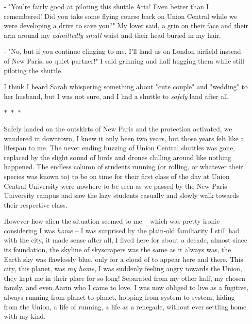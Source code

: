 \documentclass[colorlinks,12pt,a4paper]{book}
\newcommand\sep{\begin{center}
  \boldmath $\ast$~$\ast$~$\ast$
\end{center}}
\begin{document}
 - "You're fairly good at piloting this shuttle Aria! Even better than I remembered! Did you take some flying course back on Union Central 
 while we were developing a drive to save you?" My lover said, a grin on their face and their arm around my \textit{admittedly small} waist
 and their head buried in my hair.\par 
 \bigskip 
 
 - "No, but if you continue clinging to me, I'll land us on London airfield instead of New Paris, so quiet partner!" I said 
 grinning and half hugging them while still piloting the shuttle.\par 
 \bigskip
 
 I think I heard Sarah whispering something about "cute couple" and "wedding" to her husband, but I was not sure, 
 and I had a shuttle to \textit{safely} land after all.
 
 \sep
 
 Safely landed on the outskirts of New Paris and the protection activated, we wandered in downtown,
 I knew it only been two years, but those years felt like a lifespan to me. The never ending buzzing of Union Central 
 shuttles was gone, replaced by the slight sound of birds and drones chilling around like nothing happened. 
 The endless column of students running (or rolling, or whatever their species was known to) to be on 
 time for their first class of the day at Union Central University were nowhere to be seen as we passed by the New Paris University
 campus and saw the lazy students casually and slowly walk towards their respective class.\par 
 \bigskip
 
 However how alien the situation seemed to me -- which was pretty ironic considering I was \textit{home} -- I was surprised 
 by the plain-old familiarity I still had with the city, it made sense after all, I lived here for about a decade, almost since its foundation,
 the skyline of skyscrapers was the same as it always was, the Earth sky was flawlessly blue, only for a cloud of to 
 appear here and there. This city, this planet, was \textit{my home}, I was suddenly feeling angry towards the Union, they 
 kept me in their place for so long! Separated from my other half, my chosen family, and even Aarin who I came to love. I was now 
 obliged to live as a fugitive, always running from planet to planet, hopping from system to system, hiding from the Union, a life of 
 running, a life as a renegade, without ever settling home with my kind.\par 
 \bigskip
 
\end{document}
